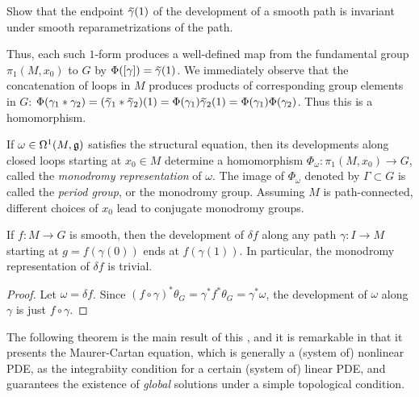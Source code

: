\begin{xca}
    Show that the endpoint $\wt{\gamma}(1)$ of the development of a smooth path is invariant under smooth reparametrizations of the path.
\end{xca}

Thus, each such $1$-form produces a well-defined map from the fundamental group $\pi_1(M,x_0)$ to $G$ by $\Phi([\gamma])=\wt{\gamma}(1)$. We immediately observe that the concatenation of loops in $M$ produces products of corresponding group elements in $G$: $\Phi(\gamma_1\ast \gamma_2)=(\wt{\gamma}_1\ast\wt{\gamma}_2)(1)=\Phi(\gamma_1)\wt{\gamma}_2(1)=\Phi(\gamma_1)\Phi(\gamma_2)$. Thus this is a homomorphism.

\begin{defn}
    If $\omega\in\Omega^1(M,\mathfrak{g})$ satisfies the structural equation, then its developments along closed loops starting at $x_0\in M$ determine a homomorphism $\Phi_\omega:\pi_1(M,x_0)\to G$, called the \emph{monodromy representation} of $\omega$. The image of $\Phi_\omega$ denoted by $\Gamma\subset G$ is called the \emph{period group}, or the {monodromy group}. Assuming $M$ is path-connected, different choices of $x_0$ lead to conjugate monodromy groups.
\end{defn}

\begin{prop}\label{prop 7.13 Sharpe}
    If $f:M\to G$ is smooth, then the development of $\delta f$ along any path $\gamma:I\to M$ starting at $g=f(\gamma(0))$ ends at $f(\gamma(1))$. In particular, the monodromy representation of $\delta f$ is trivial.
\end{prop}
\begin{proof}
    Let $\omega=\delta f$. Since $(f\circ \gamma)^\ast \theta_G=\gamma^\ast f^\ast\theta_G=\gamma^\ast\omega$, the development of $\omega$ along $\gamma$ is just $f\circ\gamma$.
\end{proof}

The following theorem is the main result of this \subsect, and it is remarkable in that it presents the Maurer-Cartan equation, which is generally a (system of) nonlinear PDE, as the integrabiity condition for a certain (system of) linear PDE, and guarantees the existence of \emph{global} solutions under a simple topological condition.

